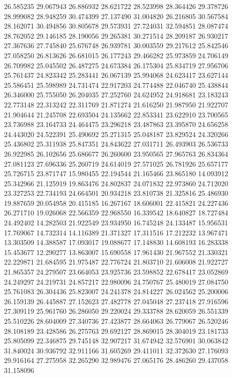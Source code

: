 26.585235
29.067943
26.886932
28.621722
28.523998
28.364426
29.378726
28.999082
28.948259
30.474399
27.137490
31.004820
26.216805
30.567584
28.162071
30.494856
30.805678
29.573931
27.724031
32.594851
28.087474
28.762052
29.146185
28.190056
29.265381
30.271514
28.209187
26.930217
27.367636
27.745840
25.676748
26.939781
30.003559
29.217612
25.842546
27.058250
26.813626
26.681015
26.177243
29.466282
25.973859
24.706149
26.709982
25.045502
26.487275
24.673384
26.175304
25.834719
27.956706
25.761437
24.823342
25.283441
26.067139
25.994068
24.623417
23.627144
25.586451
25.598989
24.731474
22.917203
24.774488
22.046740
25.438844
26.346000
25.755050
26.204035
27.252760
24.624952
24.918681
23.183243
22.773148
22.313242
22.311769
21.871274
21.616250
21.987950
21.922707
21.904644
21.245708
22.693504
24.135662
22.853341
23.622910
23.700565
23.736988
23.164733
24.464475
23.296218
23.487863
23.395870
24.656258
24.443020
24.522391
25.490692
25.271315
25.048187
23.829524
24.320266
25.436802
25.311938
25.847351
24.843622
27.031711
26.493903
26.536733
26.922985
26.102656
25.686677
26.260600
23.950565
27.965763
26.834364
27.081123
27.696336
25.260719
24.614019
27.571025
26.781926
25.657177
25.726715
23.871747
15.980455
22.194544
21.165466
23.865180
14.093912
25.342966
21.125919
19.863476
24.802837
24.071832
22.973860
24.712020
23.327253
22.734193
24.664501
20.934218
23.810738
21.325816
25.486930
19.887659
20.054958
20.415185
16.267167
18.606001
22.415821
24.227436
26.271710
19.026068
22.566359
22.968550
16.339542
18.640827
18.727484
24.492402
14.282503
21.922549
23.934950
16.745248
24.133487
15.956531
17.769067
14.732314
14.116389
21.371327
17.311516
17.212232
13.967471
13.303509
14.388587
17.093017
19.088677
17.148830
14.608193
16.283338
15.453677
12.290277
13.863007
15.690558
17.961430
21.967552
21.330321
22.229871
21.684595
21.975487
22.776724
21.803710
21.606008
21.922727
21.865357
24.279507
23.664053
23.925736
23.598852
22.678417
23.052869
24.249297
24.219731
24.857217
22.980096
24.750767
25.480019
27.084750
25.761083
26.304436
25.823007
24.241378
24.814227
26.024562
25.200006
26.159139
26.445887
27.152623
27.482778
27.045048
27.237418
27.916596
27.309119
25.961760
26.286050
29.220024
29.333788
28.620059
26.551339
25.510226
28.604009
27.340736
27.423877
28.664063
26.779067
26.520246
28.108189
23.428586
26.275763
29.692127
28.869015
28.304019
23.181733
25.805099
22.346875
29.745148
32.907217
31.674942
32.576901
30.063842
31.840024
30.936792
32.911166
31.605269
29.411011
32.372630
27.176093
29.916164
27.275958
32.265290
32.989476
27.065176
28.486260
29.437058
31.158096
